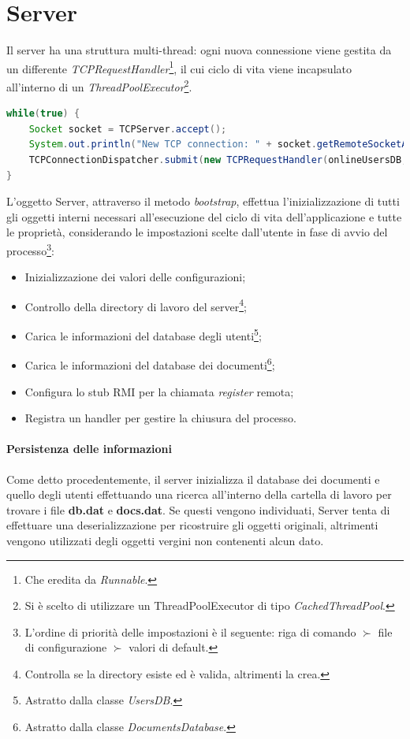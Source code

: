 \section{Server}
Il server ha una struttura multi-thread: ogni nuova connessione viene gestita da un differente \textit{TCPRequestHandler}\footnote{Che eredita da \textit{Runnable}.}, il cui ciclo di vita viene incapsulato all'interno di un \textit{ThreadPoolExecutor}\footnote{Si è scelto di utilizzare un ThreadPoolExecutor di tipo \textit{CachedThreadPool}.}. 

\begin{lstlisting}[caption="Gestione di una nuova connessione", language=java]
while(true) {
	Socket socket = TCPServer.accept();
	System.out.println("New TCP connection: " + socket.getRemoteSocketAddress().toString());
	TCPConnectionDispatcher.submit(new TCPRequestHandler(onlineUsersDB, usersDB, documentDatabase, cdaManager, socket));
}
\end{lstlisting}

L'oggetto Server, attraverso il metodo \textit{bootstrap}, effettua l'inizializzazione di tutti gli oggetti interni necessari all'esecuzione del ciclo di vita dell'applicazione e tutte le proprietà, considerando le impostazioni scelte dall'utente in fase di avvio del processo\footnote{L'ordine di priorità delle impostazioni è il seguente: riga di comando $\succ$ file di configurazione $\succ$ valori di default.}:
\begin{itemize}
	\item Inizializzazione dei valori delle configurazioni;
	\item Controllo della directory di lavoro del server\footnote{Controlla se la directory esiste ed è valida, altrimenti la crea.};
	\item Carica le informazioni del database degli utenti\footnote{Astratto dalla classe \textit{UsersDB}.};
	\item Carica le informazioni del database dei documenti\footnote{Astratto dalla classe \textit{DocumentsDatabase}.};
	\item Configura lo stub RMI per la chiamata \textit{register} remota;
	\item Registra un handler per gestire la chiusura del processo.
\end{itemize}

\paragraph{Persistenza delle informazioni}
Come detto procedentemente, il server inizializza il database dei documenti e quello degli utenti effettuando una ricerca all'interno della cartella di lavoro per trovare i file \textbf{db.dat} e \textbf{docs.dat}. Se questi vengono individuati, Server tenta di effettuare una deserializzazione per ricostruire gli oggetti originali, altrimenti vengono utilizzati degli oggetti vergini non contenenti alcun dato.

